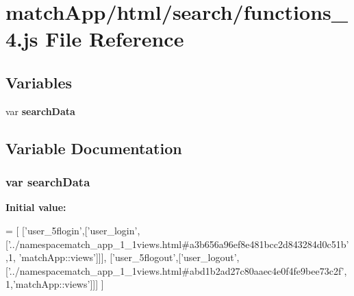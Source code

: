 \section{match\+App/html/search/functions\+\_\+4.js File Reference}
\label{functions__4_8js}
\subsection*{Variables}
\begin{DoxyCompactItemize}
\item 
var {\bf search\+Data}
\end{DoxyCompactItemize}


\subsection{Variable Documentation}
\subsubsection[{search\+Data}]{\setlength{\rightskip}{0pt plus 5cm}var search\+Data}\label{functions__4_8js_ad01a7523f103d6242ef9b0451861231e}
{\bfseries Initial value\+:}
\begin{DoxyCode}
=
[
  [\textcolor{stringliteral}{'user\_5flogin'},[\textcolor{stringliteral}{'user\_login'},[\textcolor{stringliteral}{'../namespacematch\_app\_1\_1views.html#a3b656a96ef8e481bcc2d843284d0c51b'},1,\textcolor{stringliteral}{
      'matchApp::views'}]]],
  [\textcolor{stringliteral}{'user\_5flogout'},[\textcolor{stringliteral}{'user\_logout'},[\textcolor{stringliteral}{'../namespacematch\_app\_1\_1views.html#abd1b2ad27c80aaec4e0f4fe9bee73c2f'},
      1,\textcolor{stringliteral}{'matchApp::views'}]]]
]
\end{DoxyCode}
